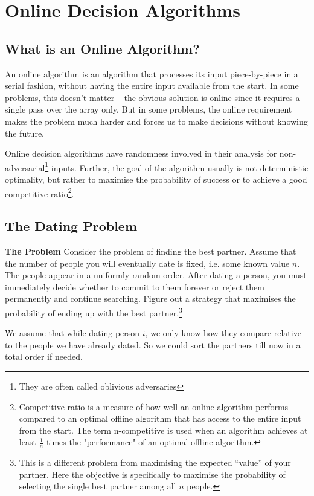 \documentclass[11pt,openany]{book}
\begin{document}
\chapter{Online Decision Algorithms}

\section*{What is an Online Algorithm?}

An online algorithm is an algorithm that processes its input piece-by-piece in a serial fashion,
 without having the entire input available from the start. In some problems, this doesn't matter -- 
 the obvious solution is online since it requires a single pass over the array only. But in some problems, 
 the online requirement makes the problem much harder and forces us to make decisions without knowing the future.

Online decision algorithms have randomness involved in their analysis for non-adversarial\footnote{They 
are often called oblivious adversaries} inputs. 
Further, the goal of the algorithm usually is not deterministic optimality, but rather to maximise the probability of 
success or to achieve a good competitive ratio\footnote{Competitive ratio is a measure of how well an online algorithm 
performs compared to an optimal offline algorithm that has access to the entire input from the start. The term n-competitive 
is used when an algorithm achieves at least $\frac{1}{n}$ times the "performance" of an optimal offline algorithm.}.

\section{The Dating Problem}

\textbf{The Problem}
Consider the problem
of finding the best partner. Assume that the number of people you will eventually date is fixed, i.e. some known value \(n\). The people appear in a uniformly random order. After dating a person, you must immediately decide whether to commit to them forever or reject them permanently and continue searching. Figure out a strategy that maximises the probability of ending up with the best partner.\footnote{This is a different problem from maximising the expected ``value'' of your partner. Here the objective is specifically to maximise the probability of selecting the single best partner among all \(n\) people.}

We assume that while dating person \(i\), we only know how they compare relative to the people we have already dated. 
So we could sort the partners till now in a total order if needed.\\
\end{document}
